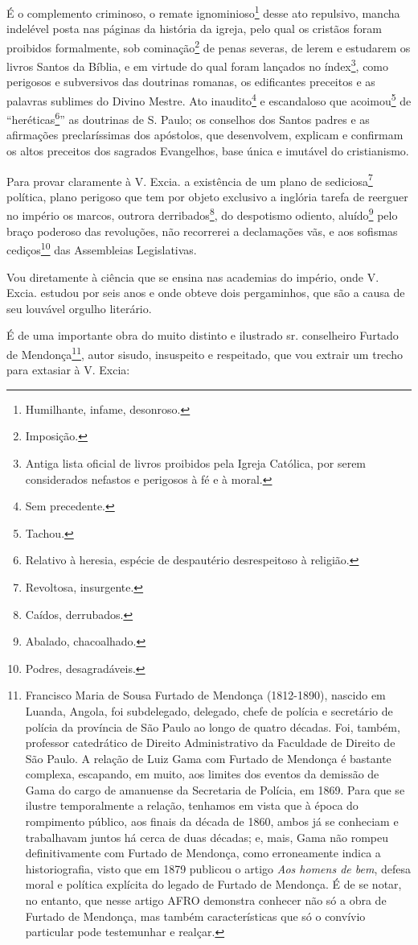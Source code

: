 É o complemento criminoso, o remate ignominioso\footnote{Humilhante,
  infame, desonroso.} desse ato repulsivo, mancha indelével posta nas
páginas da história da igreja, pelo qual os cristãos foram proibidos
formalmente, sob cominação\footnote{Imposição.} de penas severas, de
lerem e estudarem os livros Santos da Bíblia, e em virtude do qual foram
lançados no índex\footnote{Antiga lista oficial de livros proibidos
  pela Igreja Católica, por serem considerados nefastos e perigosos à fé
  e à moral.}, como perigosos e subversivos das doutrinas romanas, os
edificantes preceitos e as palavras sublimes do Divino Mestre. Ato
inaudito\footnote{Sem precedente.} e escandaloso que
acoimou\footnote{Tachou.} de ``heréticas\footnote{Relativo à heresia,
  espécie de despautério desrespeitoso à religião.}'' as doutrinas de S.
Paulo; os conselhos dos Santos padres e as afirmações preclaríssimas dos
apóstolos, que desenvolvem, explicam e confirmam os altos preceitos dos
sagrados Evangelhos, base única e imutável do cristianismo.

Para provar claramente à V. Excia. a existência de um plano de
sediciosa\footnote{Revoltosa, insurgente.} política, plano perigoso
que tem por objeto exclusivo a inglória tarefa de reerguer no império os
marcos, outrora derribados\footnote{Caídos, derrubados.}, do
despotismo odiento, aluído\footnote{Abalado, chacoalhado.} pelo braço
poderoso das revoluções, não recorrerei a declamações vãs, e aos
sofismas cediços\footnote{Podres, desagradáveis.} das Assembleias
Legislativas.

Vou diretamente à ciência que se ensina nas academias do império, onde
V. Excia. estudou por seis anos e onde obteve dois pergaminhos, que são
a causa de seu louvável orgulho literário.

É de uma importante obra do muito distinto e ilustrado sr. conselheiro
Furtado de Mendonça\footnote{Francisco Maria de Sousa Furtado de
  Mendonça (1812-1890), nascido em Luanda, Angola, foi subdelegado,
  delegado, chefe de polícia e secretário de polícia da província de São
  Paulo ao longo de quatro décadas. Foi, também, professor catedrático
  de Direito Administrativo da Faculdade de Direito de São Paulo. A
  relação de Luiz Gama com Furtado de Mendonça é bastante complexa,
  escapando, em muito, aos limites dos eventos da demissão de Gama do
  cargo de amanuense da Secretaria de Polícia, em 1869. Para que se
  ilustre temporalmente a relação, tenhamos em vista que à época do
  rompimento público, aos finais da década de 1860, ambos já se
  conheciam e trabalhavam juntos há cerca de duas décadas; e, mais, Gama
  não rompeu definitivamente com Furtado de Mendonça, como erroneamente
  indica a historiografia, visto que em 1879 publicou o artigo \emph{Aos
  homens de bem}, defesa moral e política explícita do legado de Furtado
  de Mendonça. É de se notar, no entanto, que nesse artigo AFRO
  demonstra conhecer não só a obra de Furtado de Mendonça, mas também
  características que só o convívio particular pode testemunhar e
  realçar.}, autor sisudo, insuspeito e respeitado, que vou extrair um
trecho para extasiar à V. Excia:

